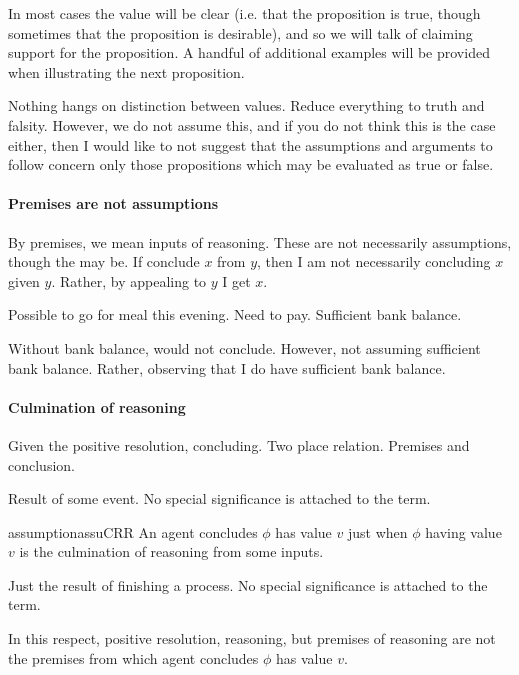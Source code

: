 \begin{note}
In most cases the value will be clear (i.e. that the proposition is true, though sometimes that the proposition is desirable), and so we will talk of claiming support for the proposition.
  A handful of additional examples will be provided when illustrating the next proposition.
\end{note}

\begin{note}
  Nothing hangs on distinction between values.
  Reduce everything to truth and falsity.
  However, we do not assume this, and if you do not think this is the case either, then I would like to not suggest that the assumptions and arguments to follow concern only those propositions which may be evaluated as true or false.
\end{note}

\paragraph*{Premises are not assumptions}

\begin{note}
  By premises, we mean inputs of reasoning.
  These are not necessarily assumptions, though the may be.
  If conclude \(x\) from \(y\), then I am not necessarily concluding \(x\) given \(y\).
  Rather, by appealing to \(y\) I get \(x\).

  Possible to go for meal this evening.
  Need to pay.
  Sufficient bank balance.

  Without bank balance, would not conclude.
  However, not assuming sufficient bank balance.
  Rather, observing that I do have sufficient bank balance.
\end{note}

\paragraph*{Culmination of reasoning}

\begin{note}
  Given the positive resolution, concluding.
  Two place relation.
  Premises and conclusion.

  Result of some event.
  No special significance is attached to the term.

  \begin{restatable}{assumption}{assuCRR}
    \label{assu:C-culmination-of-R}
    An agent concludes \(\phi\) has value \(v\) just when \(\phi\) having value \(v\) is the culmination of reasoning from some inputs.
  \end{restatable}

  Just the result of finishing a process.
  No special significance is attached to the term.

  In this respect, positive resolution, reasoning, but premises of reasoning are not the premises from which agent concludes \(\phi\) has value \(v\).
\end{note}

